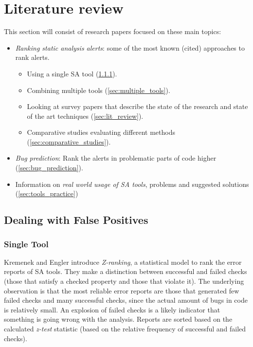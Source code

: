 \section{Literature review}\label{sec:literature}

This section will consist of research papers focused on these main topics: 
\begin{itemize}
    \item \textit{Ranking static analysis alerts}: some of the most known (cited) approaches to rank alerts.
    \begin{itemize}
        \item Using a single SA tool (\cref{sec:single_tool}).
        \item Combining multiple tools  (\cref{sec:multiple_tools}).
        \item Looking at survey papers that describe the state of the research and state of the art techniques (\cref{sec:lit_review}).
        \item Comparative studies evaluating different methods (\cref{sec:comparative_studies}).
    \end{itemize}
    \item \textit{Bug prediction}: Rank the alerts in problematic parts of code higher (\cref{sec:bug_prediction}).
    \item Information on \textit{real world usage of SA tools}, problems and suggested solutions (\cref{sec:tools_practice})
\end{itemize}

 \subsection{Dealing with False Positives}

 \subsubsection{Single Tool}
 \label{sec:single_tool}

 Kremenek and Engler \cite{z-ranking} introduce \textit{Z-ranking}, a statistical model to rank the error reports of SA tools. They make a distinction between successful and failed checks (those that satisfy a checked property and those that violate it). The underlying observation is that the most reliable error reports are those that generated few failed checks and many successful checks, since the actual amount of bugs in code is relatively small. An explosion of failed checks is a likely indicator that something is going wrong with the analysis. Reports are sorted based on the calculated \textit{z-test} statistic (based on the relative frequency of successful and failed checks).

